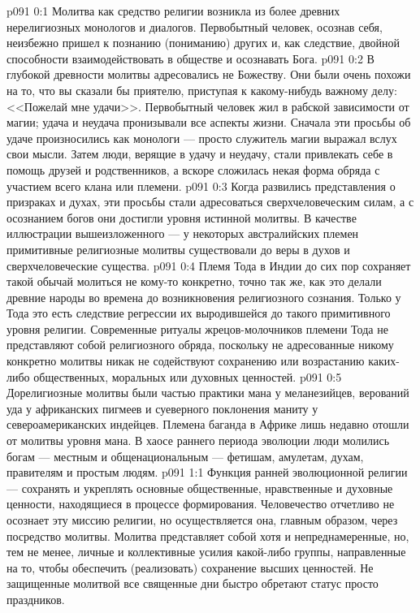 \vs p091 0:1 Молитва как средство религии возникла из более древних нерелигиозных монологов и диалогов. Первобытный человек, осознав себя, неизбежно пришел к познанию (пониманию) других и, как следствие, двойной способности взаимодействовать в обществе и осознавать Бога.
\vs p091 0:2 В глубокой древности молитвы адресовались не Божеству. Они были очень похожи на то, что вы сказали бы приятелю, приступая к какому\hyp{}нибудь важному делу: <<Пожелай мне удачи>>. Первобытный человек жил в рабской зависимости от магии; удача и неудача пронизывали все аспекты жизни. Сначала эти просьбы об удаче произносились как монологи --- просто служитель магии выражал вслух свои мысли. Затем люди, верящие в удачу и неудачу, стали привлекать себе в помощь друзей и родственников, а вскоре сложилась некая форма обряда с участием всего клана или племени.
\vs p091 0:3 Когда развились представления о призраках и духах, эти просьбы стали адресоваться сверхчеловеческим силам, а с осознанием богов они достигли уровня истинной молитвы. В качестве иллюстрации вышеизложенного --- у некоторых австралийских племен примитивные религиозные молитвы существовали до веры в духов и сверхчеловеческие существа.
\vs p091 0:4 Племя Тода в Индии до сих пор сохраняет такой обычай молиться не кому\hyp{}то конкретно, точно так же, как это делали древние народы во времена до возникновения религиозного сознания. Только у Тода это есть следствие регрессии их выродившейся до такого примитивного уровня религии. Современные ритуалы жрецов\hyp{}молочников племени Тода не представляют собой религиозного обряда, поскольку не адресованные никому конкретно молитвы никак не содействуют сохранению или возрастанию каких\hyp{}либо общественных, моральных или духовных ценностей.
\vs p091 0:5 Дорелигиозные молитвы были частью практики мана у меланезийцев, верований уда у африканских пигмеев и суеверного поклонения маниту у североамериканских индейцев. Племена баганда в Африке лишь недавно отошли от молитвы уровня мана. В хаосе раннего периода эволюции люди молились богам --- местным и общенациональным --- фетишам, амулетам, духам, правителям и простым людям.
\vs p091 1:1 Функция ранней эволюционной религии --- сохранять и укреплять основные общественные, нравственные и духовные ценности, находящиеся в процессе формирования. Человечество отчетливо не осознает эту миссию религии, но осуществляется она, главным образом, через посредство молитвы. Молитва представляет собой хотя и непреднамеренные, но, тем не менее, личные и коллективные усилия какой\hyp{}либо группы, направленные на то, чтобы обеспечить (реализовать) сохранение высших ценностей. Не защищенные молитвой все священные дни быстро обретают статус просто праздников.
